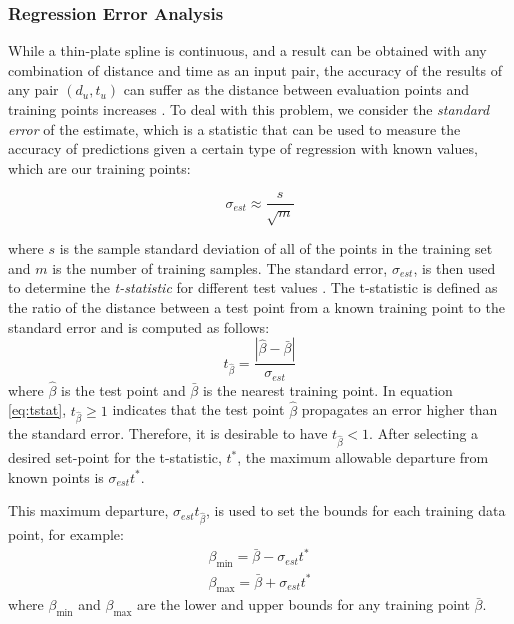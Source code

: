 \documentclass[letterpaper, 10 pt, conference]{ieeeconf}  %
\newcommand\NB[1]{$\spadesuit$\footnote{NB: #1}}
\begin{document}
\subsubsection{Regression Error Analysis} \label{sec:regerror}
While a thin-plate spline is continuous, and a result can be obtained with any combination of distance and time as an input pair, the accuracy of the results of any pair $(d_u,t_u)$ can suffer as the distance between evaluation points and training points increases \cite{regress}. To deal with this problem, we consider the {\em standard error} of the estimate, which is a statistic that can be used to measure the accuracy of predictions given a certain type of regression \cite{stdereg} with known values, which are our training points:

\begin{equation} \label{eq:stderr}
    \sigma_{est} \approx \frac{s}{\sqrt{m}}
\end{equation}

where $s$ is the sample standard deviation of all of the points in the training set and $m$ is the number of training samples. The standard error, $\sigma_{est}$, is then used to determine the {\em t-statistic} for different test values \cite{tstat}. The t-statistic is defined as the ratio of the distance between a test point from a known training point to the standard error and is computed as follows:
\begin{equation} \label{eq:tstat}
t_{\hat{\beta}} = \frac{|\hat{\beta}-\bar{\beta}|}{\sigma_{est}}    
\end{equation}
where $\hat{\beta}$ is the test point and $\bar{\beta}$ is the nearest training point. In equation \eqref{eq:tstat}, $t_{\hat{\beta}} \geq 1$ indicates that the test point $\hat{\beta}$ propagates an error higher than the standard error. Therefore, it is desirable to have $t_{\hat{\beta}} < 1$. 
After selecting a desired set-point for the t-statistic, $t^*$, the maximum allowable departure from known points is $\sigma_{est}t^*$.

This maximum departure, $\sigma_{est}t_{\hat{\beta}}$, is used to set the bounds for each training data point, for example:
\begin{align}
    \beta_{\min} = \bar{\beta} - \sigma_{est}t^* \nonumber \\
    \beta_{\max} = \bar{\beta} + \sigma_{est}t^*
\end{align}
where $\beta_{\min}$ and $\beta_{\max}$ are the lower and upper bounds for any training point $\bar{\beta}$. %
\end{document}
